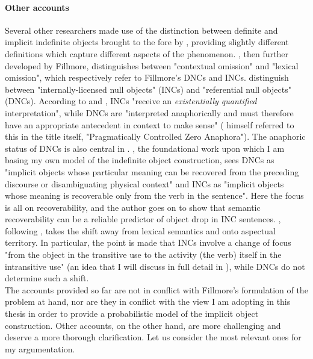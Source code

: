 \paragraph{Other accounts}
Several other researchers made use of the distinction between definite and implicit indefinite objects brought to the fore by \textcite{Fillmore1986}, providing slightly different definitions which capture different aspects of the phenomenon. \textcite{Allerton1975}, then further developed by Fillmore, distinguishes between "contextual omission" and "lexical omission", which respectively refer to Fillmore's DNCs and INCs. \textcite{CumminsRoberge2004} distinguish between "internally-licensed null objects" (INCs) and "referential null objects" (DNCs). According to \textcite{ruppenhofer2005regularities} and \textcite[30]{PethoKardos2006}, INCs "receive an \textit{existentially quantified} interpretation", while DNCs are "interpreted anaphorically and must therefore have an appropriate antecedent in context to make sense" (\textcite{Fillmore1986} himself referred to this in the title itself, "Pragmatically Controlled Zero Anaphora"). The anaphoric status of DNCs is also central in \textcite{KellerLapata1998}. \textcite[13]{Medina2007}, the foundational work upon which I am basing my own model of the indefinite object construction, sees DNCs as "implicit objects whose particular meaning can be recovered from the preceding discourse or disambiguating physical context" and INCs as "implicit objects whose meaning is recoverable only from the verb in the sentence". Here the focus is all on recoverability, and the author goes on to show that semantic recoverability can be a reliable predictor of object drop in INC sentences. \textcite[293]{Liu2008}, following \textcite{Garcia-VelascoMunoz2002}, takes the shift away from lexical semantics and onto aspectual territory. In particular, the point is made that INCs involve a change of focus "from the object in the transitive use to the activity (the verb) itself in the intransitive use" (an idea that I will discuss in full detail in ), while DNCs do not determine such a shift.\\
The accounts provided so far are not in conflict with Fillmore's formulation of the problem at hand, nor are they in conflict with the view I am adopting in this thesis in order to provide a probabilistic model of the implicit object construction. Other accounts, on the other hand, are more challenging and deserve a more thorough clarification. Let us consider the most relevant ones for my argumentation.\\

